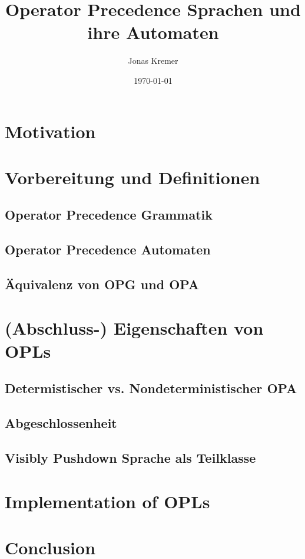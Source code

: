 \documentclass{article}
\author{Jonas Kremer}
\title{Operator Precedence Sprachen und ihre Automaten}
\date{\today{}}
\begin{document}
\maketitle
\newpage
\tableofcontents
\newpage
\section{Motivation}

\section{Vorbereitung und Definitionen}

\subsection{Operator Precedence Grammatik}

\subsection{Operator Precedence Automaten}

\subsection{Äquivalenz von OPG und OPA}

\section{(Abschluss-) Eigenschaften von OPLs}

\subsection{Determistischer vs. Nondeterministischer OPA}

\subsection{Abgeschlossenheit}

\subsection{Visibly Pushdown Sprache als Teilklasse}

\section{Implementation of OPLs}

\section{Conclusion}


\end{document}
